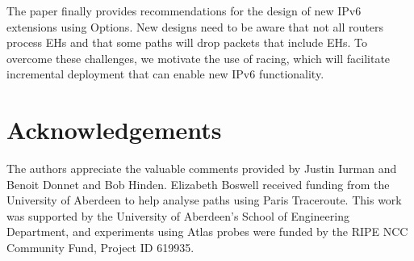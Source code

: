 \documentclass[conference]{IEEEtran}
\begin{document}
The paper finally provides recommendations for the design of new IPv6 extensions using Options. New designs need to be aware that not all routers process EHs and that some paths will drop packets that include EHs. To overcome these challenges, we motivate the use of racing, which will facilitate incremental deployment that can enable new IPv6 functionality. 

\section*{Acknowledgements}

The authors appreciate the valuable comments provided by Justin Iurman and Benoit Donnet and Bob Hinden. Elizabeth Boswell received funding from the University of Aberdeen to help analyse paths using Paris Traceroute. This work was supported by the University of Aberdeen's School of Engineering Department, and experiments using Atlas probes were funded by the RIPE NCC Community Fund, Project ID 619935.


\small

\end{document}
